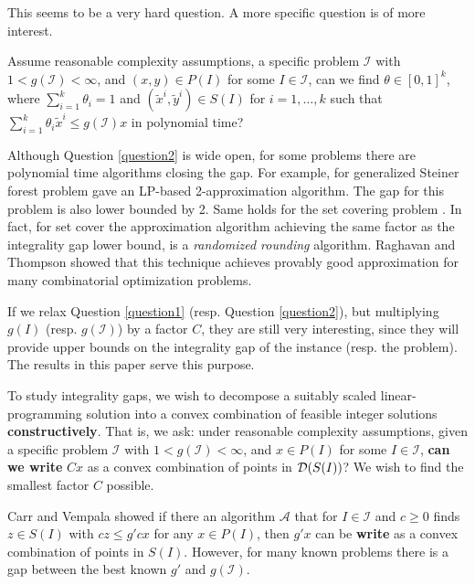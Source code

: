 This seems to be a very hard question. A more specific question is of more interest.

\begin{question}\label{question2}
	Assume reasonable complexity assumptions, a specific problem $\mathcal{I}$ with  $1<g({\mathcal{I}})<\infty$, and $(x,y)\in P(I)$ for some $I\in \mathcal{I}$, can we find $\theta \in [0,1]^k$, where $\sum_{i=1}^{k}\theta_i =1$ and $(\tilde{x}^i,\tilde{y}^i)\in S(I)$ for $i=1,\ldots,k$ such that $\sum_{i=1}^{k}\theta_i \tilde{x}^i\leq g(\mathcal{I})x$ in polynomial time?
\end{question}
Although Question \ref{question2} is wide open, for some problems there are polynomial time algorithms closing the gap. For example, for generalized Steiner forest problem \cite{jain} gave an LP-based 2-approximation algorithm. The gap for this problem is also lower bounded by 2. Same holds for the set covering problem \cite{randomizedrounding}. In fact, for set cover the approximation algorithm achieving the same factor as the integrality gap lower bound, is a \textit{randomized rounding} algorithm. Raghavan and Thompson \cite{randomizedrounding} showed that this technique achieves provably good approximation for many combinatorial optimization problems.  

If we relax Question \ref{question1} (resp. Question \ref{question2}), but multiplying $g(I)$ (resp. $g(\mathcal{I})$) by a factor $C$, they are still very interesting, since they will provide upper bounds on the integrality gap of the instance (resp. the problem). The results in this paper serve this purpose.
\fi

To study integrality gaps, we wish to decompose a suitably scaled linear-programming solution into a convex combination of feasible integer solutions {\bf constructively}. That is, we ask: under reasonable complexity assumptions, given a specific problem $\mathcal{I}$ with  $1<g(\mathcal{I})<\infty$, and $x\in P(I)$ for some $I\in \mathcal{I}$, \textbf{can we write} $Cx$ as a convex combination of points in $\operatorname{\mathcal{D}}(S(I))$? We wish to find the smallest factor $C$ possible.

Carr and Vempala \cite{metarounding} showed if there an algorithm $\mathcal{A}$ that for $I\in \mathcal{I}$ and $c\geq 0$ finds $z\in S(I)$ with $cz\leq g'cx$ for any $x\in P(I)$, then $g'x$ can be \textbf{write} as a convex combination of points in $S(I)$. However, for many known problems there is a gap between the best known $g'$ and $g(\mathcal{I})$. 

